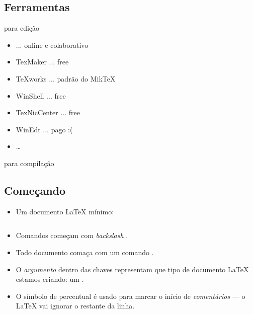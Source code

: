\documentclass{beamer}
\begin{document}
\subsection{Ferramentas}
\begin{frame}[fragile]{\insertsubsection {} para edição}
	\begin{itemize}
		\item \wllogo{} ... online e colaborativo
		\item TexMaker ... free
		\item \TeX works ... padrão do Mik\TeX
		\item WinShell ... free
		\item TexNicCenter ... free
		\item WinEdt ... pago :(
		\item \ldots
	\end{itemize}
\end{frame}

\begin{frame}[fragile]{\insertsubsection {} para compilação}
\end{frame}


\subsection{Começando}
\begin{frame}[fragile]{\insertsubsection}
\begin{itemize}
	\item Um documento \LaTeX{} mínimo:
		\inputminted[frame=single]{latex}{basics.tex}
	
	\item Comandos começam com  \emph{backslash} \keystrokebftt{\bs}.
	\item Todo documento comaça com um comando .
	\item O \emph{argumento} dentro das chaves \keystrokebftt{\{} \keystrokebftt{\}} representam que tipo de documento \LaTeX{} estamos criando: um .
	\item O símbolo de percentual \keystrokebftt{\%} é usado para marcar o início de \emph{comentários} --- o \LaTeX{} vai ignorar o restante da linha.
\end{itemize}
\end{frame}
\end{document}
